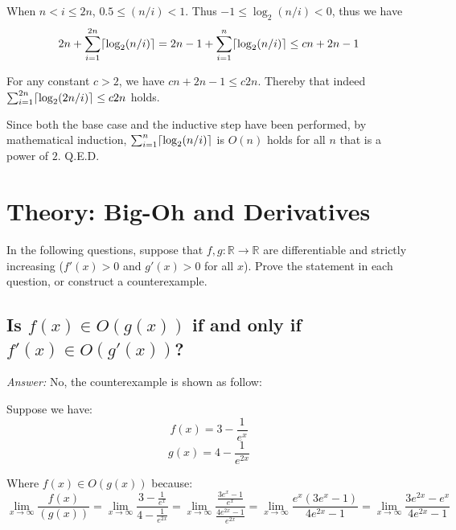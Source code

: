 \documentclass[11pt]{article}
\DeclarePairedDelimiter{\ceil}{\lceil}{\rceil}
\begin{document}
	When $n<i\leq2n$, $0.5\leq(n/i)<1$. Thus $-1\leq\log_2(n/i)<0$, thus we have
	\begin{equation*}
		2n+\sum_{i=1}^{2n}\ceil{\log_2(n/i)} = 2n-1+\sum_{i=1}^{n}\ceil{\log_2(n/i)}\leq cn+2n-1
	\end{equation*}
	
	For any constant $c>2$, we have $cn+2n-1\leq c2n$. Thereby that indeed $\sum_{i=1}^{2n} \ceil{\log_2(2n/i)}\leq c2n$ holds.
	
	Since both the base case and the inductive step have been performed, by mathematical induction, $\sum_{i=1}^{n} \ceil{\log_2(n/i)}$ is $O(n)$ holds for all $n$ that is a power of $2$. Q.E.D.
	
\section{Theory: Big-Oh and Derivatives}
	In the following questions, suppose that $f,g : \mathbb{R} \to \mathbb{R}$ are differentiable and strictly increasing ($f'(x) >0$ and $g'(x)>0$ for all $x$). Prove the statement in each question, or construct a counterexample.
\subsection{Is $f(x)\in O(g(x))$ if and only if $f'(x)\in O(g'(x))$?}
	\emph{Answer:} No, the counterexample is shown as follow:
	
	Suppose we have:
	\begin{equation*}
		f(x) = 3-\frac{1}{e^x}
	\end{equation*}
	\begin{equation*}
		g(x) = 4-\frac{1}{e^{2x}}
	\end{equation*}
	
	Where $f(x)\in O(g(x))$ because:
	\begin{equation*}
		\lim_{x\to\infty} \frac{f(x)}{(g(x))} = \lim_{x\to\infty}\frac{3-\frac{1}{e^x}}{4-\frac{1}{e^{2x}}}=\lim_{x\to\infty} \frac{\frac{3e^x-1}{e^x}}{\frac{4e^{2x}-1}{e^{2x}}}=\lim_{x\to\infty}\frac{e^x(3e^x-1)}{4e^{2x}-1}=\lim_{x\to\infty}\frac{3e^{2x}-e^x}{4e^{2x}-1}
	\end{equation*}
	
\end{document}
